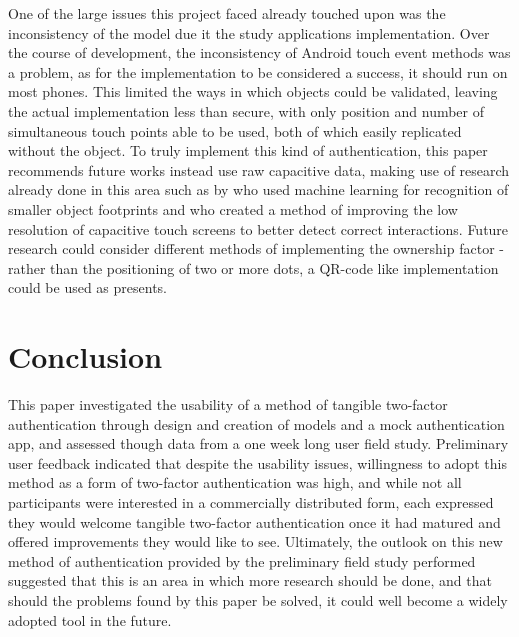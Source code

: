 \documentclass{l4proj}
\begin{document}
One of the large issues this project faced already touched upon was the inconsistency of the model due it the study applications implementation. Over the course of development, the inconsistency of Android touch event methods was a problem, as for the implementation to be considered a success, it should run on most phones. This limited the ways in which objects could be validated, leaving the actual implementation less than secure, with only position and number of simultaneous touch points able to be used, both of which easily replicated without the object. To truly implement this kind of authentication, this paper recommends future works instead use raw capacitive data, making use of research already done in this area such as by \cite{schmitz2021itsy} who used machine learning for recognition of smaller object footprints and \cite{mayer2021super} who created a method of improving the low resolution of capacitive touch screens to better detect correct interactions. Future research could consider different methods of implementing the ownership factor - rather than the positioning of two or more dots, a QR-code like implementation could be used as \cite{yu2011tuic} presents.

\chapter{Conclusion}    

This paper investigated the usability of a method of tangible two-factor authentication through design and creation of models and a mock authentication app, and assessed though data from a one week long user field study. Preliminary user feedback indicated that despite the usability issues, willingness to adopt this method as a form of two-factor authentication was high, and while not all participants were interested in a commercially distributed form, each expressed they would welcome tangible two-factor authentication once it had matured and offered improvements they would like to see. Ultimately, the outlook on this new method of authentication provided by the preliminary field study performed suggested that this is an area in which more research should be done, and that should the problems found by this paper be solved, it could well become a widely adopted tool in the future.


\end{document}
